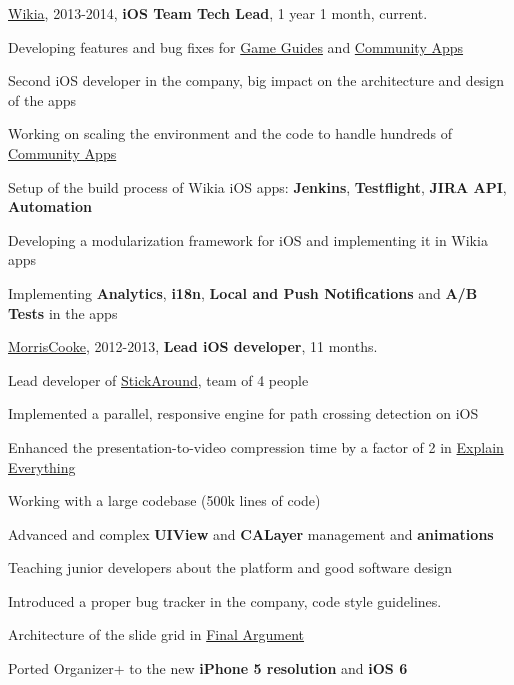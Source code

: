 \documentclass[letterpaper]{article}
\renewenvironment{itemize}{
  \begin{list}{}{
    \setlength{\leftmargin}{1.5em}
  }
}{
  \end{list}
}
\begin{document}
\begin{itemize}
    \item \href{http://www.wikia.com}{Wikia}, 2013-2014, {\bf iOS Team Tech Lead}, 1 year 1 month, current.
        \begin{itemize}
            \item Developing features and bug fixes for \href{https://itunes.apple.com/us/app/wikia-game-guides-walkthroughs/id422467074?mt=8}{Game Guides} and \href{https://itunes.apple.com/us/artist/wikia-inc./id422467077}{Community Apps}
            \item Second iOS developer in the company, big impact on the architecture and design of the apps
            \item Working on scaling the environment and the code to handle hundreds of \href{https://itunes.apple.com/us/artist/wikia-inc./id422467077}{Community Apps}
            \item Setup of the build process of Wikia iOS apps: {\bf Jenkins}, {\bf Testflight}, {\bf JIRA API}, {\bf Automation}
            \item Developing a modularization framework for iOS and implementing it in Wikia apps
            \item Implementing {\bf Analytics}, {\bf i18n}, {\bf Local and Push Notifications} and {\bf A/B Tests} in the apps
        \end{itemize}
    \item \href{http://www.morriscooke.com}{MorrisCooke}, 2012-2013, {\bf Lead iOS developer}, 11 months.
		\begin{itemize}
            \item Lead developer of \href{https://itunes.apple.com/us/app/stick-around-by-tony-vincent/id557949353?mt=8}{StickAround}, team of 4 people
            \item Implemented a parallel, responsive engine for path crossing detection on iOS
            \item Enhanced the presentation-to-video compression time by a factor of 2 in \href{https://itunes.apple.com/us/app/explain-everything/id431493086?mt=8}{Explain Everything}
            \item Working with a large codebase (500k lines of code)
            \item Advanced and complex {\bf UIView} and {\bf CALayer} management and {\bf animations}
            \item Teaching junior developers about the platform and good software design
            \item Introduced a proper bug tracker in the company, code style guidelines.
            \item Architecture of the slide grid in \href{https://itunes.apple.com/us/app/final-argument/id480232096?mt=8}{Final Argument}
            \item Ported Organizer+ to the new {\bf iPhone 5 resolution} and {\bf iOS 6}
		\end{itemize}


\end{itemize}
\end{document}
